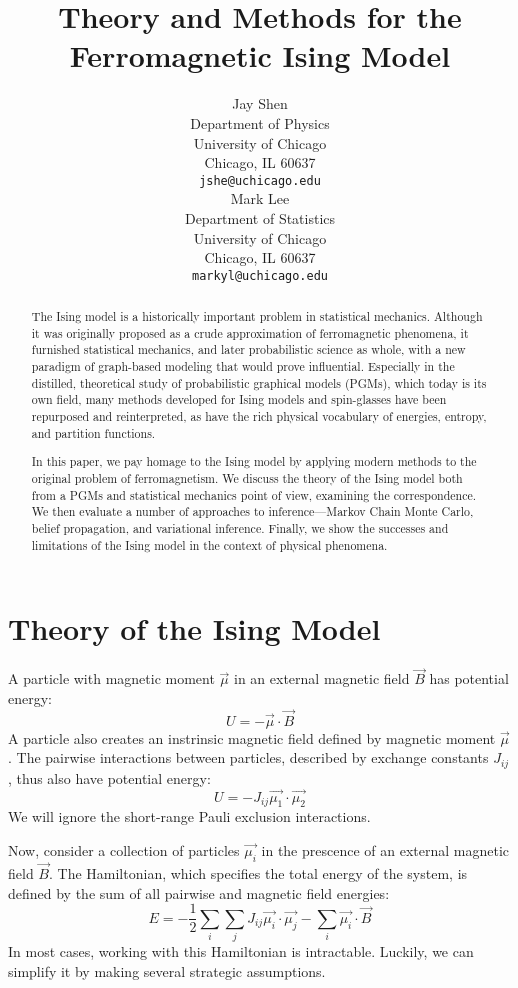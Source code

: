 \documentclass{article}
\title{Theory and Methods for the Ferromagnetic Ising Model}
\author{
    Jay Shen \\
    Department of Physics \\
    University of Chicago\\
    Chicago, IL 60637 \\
    \texttt{jshe@uchicago.edu} \\
    \And
    Mark Lee \\
    Department of Statistics \\
    University of Chicago\\
    Chicago, IL 60637 \\
    \texttt{markyl@uchicago.edu} \\
}
\begin{document}
\maketitle

\begin{abstract}

The Ising model is a historically important problem in statistical mechanics. 
Although it was originally proposed as a crude approximation of ferromagnetic 
phenomena, it furnished statistical mechanics, and later probabilistic science 
as whole, with a new paradigm of graph-based modeling that would prove 
influential.
Especially in the distilled, theoretical study of probabilistic graphical 
models (PGMs), which today is its own field, many methods developed for Ising models 
and spin-glasses have been repurposed and reinterpreted, as have the rich 
physical vocabulary of energies, entropy, and partition functions. 

In this paper, we pay homage to the Ising model by applying modern methods to 
the original problem of ferromagnetism. 
We discuss the theory of the Ising model both from a PGMs and statistical 
mechanics point of view, examining the correspondence. 
We then evaluate a number of approaches to inference—Markov Chain Monte Carlo, 
belief propagation, and variational inference. 
Finally, we show the successes and limitations of the Ising model in the context 
of physical phenomena. 

\end{abstract}


\section{Theory of the Ising Model}

A particle with magnetic moment $\vec{\mu}$ in an external magnetic field 
$\vec{B}$ has potential energy:
\[U = - \vec{\mu} \cdot \vec{B}\]
A particle also creates an instrinsic magnetic field defined by magnetic moment 
$\vec{\mu}$. 
The pairwise interactions between particles, described by exchange constants 
$J_{ij}$, thus also have potential energy:
\[U = - J_{ij} \vec{\mu_1} \cdot \vec{\mu_2}\]
We will ignore the short-range Pauli exclusion interactions. 

Now, consider a collection of particles $\vec{\mu_i}$ in the prescence of an 
external magnetic field $\vec{B}$. 
The Hamiltonian, which specifies the total energy of the system, is defined by 
the sum of all pairwise and magnetic field energies:
\begin{equation}\label{exactE}
    E = -\frac{1}{2}\sum_i \sum_j J_{ij} \vec{\mu_i} \cdot \vec{\mu_j} - \sum_i \vec{\mu_i} \cdot \vec{B}
\end{equation}
In most cases, working with this Hamiltonian is intractable. 
Luckily, we can simplify it by making several strategic assumptions. 
\end{document}
